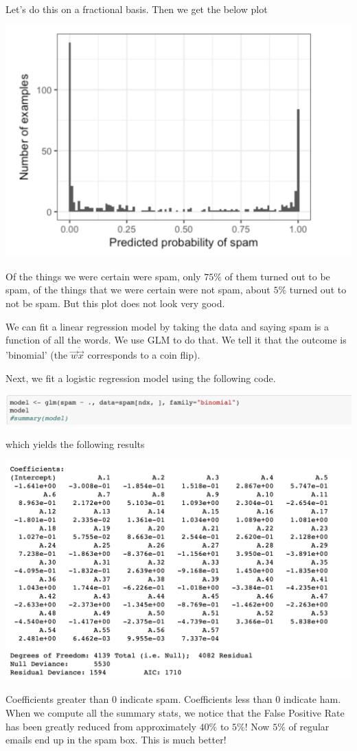 Let's do this on a fractional basis. Then we get the below plot

\includegraphics[scale=0.40]{ask2256/figures/fractions_plot.png}

Of the things we were certain were spam, only $75\%$ of them turned out to be spam, of the things that we were certain were not spam, about $5\%$ turned out to not be spam. But this plot does not look very good. 

We can fit a linear regression model by taking the data and saying spam is a function of all the words. We use GLM to do that. We tell it that the outcome is 'binomial' (the $\vec{w} \dot \vec{x}$ corresponds to a coin flip). 

Next, we fit a logistic regression model using the following code. 

\includegraphics[scale=0.40]{ask2256/figures/glm_code.png}

which yields the following results

\includegraphics[scale=0.40]{ask2256/figures/glm_results.png}

Coefficients greater than $0$ indicate spam. Coefficients less than $0$ indicate ham. When we compute all the summary stats, we notice that the False Positive Rate has been greatly reduced from approximately $40\%$ to $5\%$! Now $5\%$ of regular emails end up in the spam box. This is much better! 


